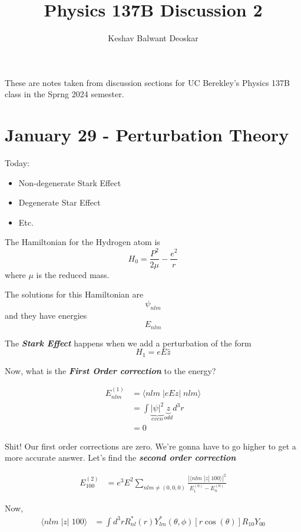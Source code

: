 \documentclass{article}
\title{Physics 137B Discussion 2}
\author{Keshav Balwant Deoskar}
\newcommand{\inner}[2]{\langle #1 | #2 \rangle}
\begin{document}
\maketitle

These are notes taken from discussion sections for UC Berekley's Physics 137B class in the Sprng 2024 semester.

\tableofcontents

\pagebreak

\section{January 29 - Perturbation Theory}

\vskip 0.5cm
Today:
\begin{itemize}
  \item Non-degenerate Stark Effect
  \item Degenerate Star Effect
  \item Etc.
\end{itemize}

\vskip 0.5cm
The Hamiltonian for the Hydrogen atom is 
\[ H_0 = \frac{P^2}{2\mu} - \frac{e^2}{r} \]
where $\mu$ is the reduced mass.

The solutions for this Hamiltonian are 
\[ \psi_{nlm} \]
and they have energies 
\[ E_{nlm} \]

\vskip 0.5cm
The \emph{\textbf{Stark Effect}} happens when we add a perturbation of the form 
\[ H_1 = eE \hat{z} \]

Now, what is the \emph{\textbf{First Order correction}} to the energy?

\begin{align*}
  E_{nlm}^{(1)} &= \inner{nlm\;}{eEz | \;nlm} \\
  &= \int \underbrace{|\psi|^2}_{even} \underbrace{z}_{odd} d^3r \\
  &= 0
\end{align*}

Shit! Our first order corrections are zero. We're gonna have to go higher to get a more accurate answer. Let's find the \emph{\textbf{second order correction}}

\begin{align*}
  E_{100}^{(2)} &= e^3 E^2 \sum_{nlm \neq (0,0,0)} \frac{|\inner{nlm\;}{z|\;100}|^2}{E_1^{(0)} - E_n^{(0)}}
\end{align*}

Now, 
\begin{align*}
  \inner{nlm\;}{z|\;100} &= \int d^3 r R_{nl}^{*}(r) Y^{*}_{lm}(\theta, \phi) [r \cos(\theta)] R_{10} Y_{00}
\end{align*}
\end{document}
